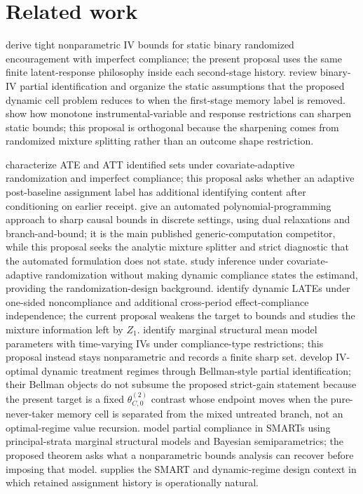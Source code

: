 \documentclass[11pt]{article}
\theoremstyle{definition}
\theoremstyle{plain}
\theoremstyle{remark}
\begin{document}
\section{Related work}
\citet{BalkePearl1997} derive tight nonparametric IV bounds for static binary randomized encouragement with imperfect compliance; the present proposal uses the same finite latent-response philosophy inside each second-stage history.  \citet{SwansonHernanMillerRobinsRichardson2018} review binary-IV partial identification and organize the static assumptions that the proposed dynamic cell problem reduces to when the first-stage memory label is removed.  \citet{ManskiPepper2000} show how monotone instrumental-variable and response restrictions can sharpen static bounds; this proposal is orthogonal because the sharpening comes from randomized mixture splitting rather than an outcome shape restriction.

\citet{BugniGaoObradovicVelez2024} characterize ATE and ATT identified sets under covariate-adaptive randomization and imperfect compliance; this proposal asks whether an adaptive post-baseline assignment label has additional identifying content after conditioning on earlier receipt.  \citet{DuarteFinkelsteinKnoxMummoloShpitser2024} give an automated polynomial-programming approach to sharp causal bounds in discrete settings, using dual relaxations and branch-and-bound; it is the main published generic-computation competitor, while this proposal seeks the analytic mixture splitter and strict diagnostic that the automated formulation does not state.  \citet{BugniCanayShaikh2018} study inference under covariate-adaptive randomization without making dynamic compliance states the estimand, providing the randomization-design background.  \citet{SojitraSyrgkanis2024} identify dynamic LATEs under one-sided noncompliance and additional cross-period effect-compliance independence; the current proposal weakens the target to bounds and studies the mixture information left by \(Z_1\).  \citet{MichaelCuiLorchTchetgen2024} identify marginal structural mean model parameters with time-varying IVs under compliance-type restrictions; this proposal instead stays nonparametric and records a finite sharp set.  \citet{ChenZhang2023} develop IV-optimal dynamic treatment regimes through Bellman-style partial identification; their Bellman objects do not subsume the proposed strict-gain statement because the present target is a fixed \(\theta_{C,0}^{(2)}\) contrast whose endpoint moves when the pure-never-taker memory cell is separated from the mixed untreated branch, not an optimal-regime value recursion.  \citet{ArtmanBhattacharyaErtefaieLynchMcKayJohnson2024} model partial compliance in SMARTs using principal-strata marginal structural models and Bayesian semiparametrics; the proposed theorem asks what a nonparametric bounds analysis can recover before imposing that model.  \citet{Murphy2005} supplies the SMART and dynamic-regime design context in which retained assignment history is operationally natural.
\end{document}
